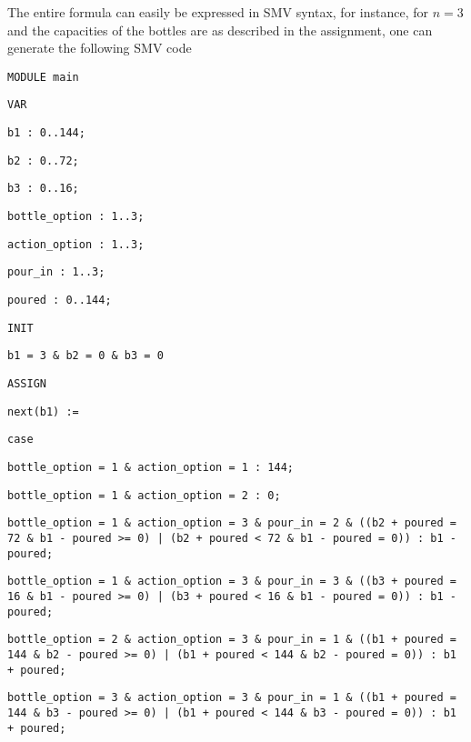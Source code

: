 \documentclass[a4paper]{article}
\begin{document}
	The entire formula can easily be expressed in SMV syntax, for instance, for $n=3$ and the capacities of the bottles are as described in the assignment, one can generate the following SMV code\\

{\footnotesize

{\tt MODULE main }

{\tt VAR }

{\tt b1 : 0..144; }

{\tt b2 : 0..72; }

{\tt b3 : 0..16; }

{\tt bottle\_option : 1..3; }

{\tt action\_option : 1..3; }

{\tt pour\_in : 1..3; }

{\tt poured : 0..144; }

\vspace{1em}

{\tt INIT }

{\tt b1 = 3\ \&\ b2 = 0\ \&\ b3 = 0 }

\vspace{1em}

{\tt ASSIGN }

{\tt next(b1) := }

{\tt 	case }


{\tt 		bottle\_option = 1\ \&\ action\_option = 1 : 144; }

{\tt 		bottle\_option = 1\ \&\ action\_option = 2 : 0; }

\vspace{1em}

{\tt 		bottle\_option = 1\ \&\ action\_option = 3\ \&\ pour\_in = 2\ \&\ ((b2 + poured = 72\ \&\ b1 - poured >= 0)\ |\ (b2 + poured < 72\ \&\ b1 - poured = 0)) : b1 - poured; }

{\tt 		bottle\_option = 1\ \&\ action\_option = 3\ \&\ pour\_in = 3\ \&\ ((b3 + poured = 16\ \&\ b1 - poured >= 0)\ |\ (b3 + poured < 16\ \&\ b1 - poured = 0)) : b1 - poured; }

\vspace{1em}

{\tt 		bottle\_option = 2\ \&\ action\_option = 3\ \&\ pour\_in = 1\ \&\ ((b1 + poured = 144\ \&\ b2 - poured >= 0)\ |\ (b1 + poured < 144\ \&\ b2 - poured = 0)) : b1 + poured; }

{\tt 		bottle\_option = 3\ \&\ action\_option = 3\ \&\ pour\_in = 1\ \&\ ((b1 + poured = 144\ \&\ b3 - poured >= 0)\ |\ (b1 + poured < 144\ \&\ b3 - poured = 0)) : b1 + poured; }

}
\end{document}
